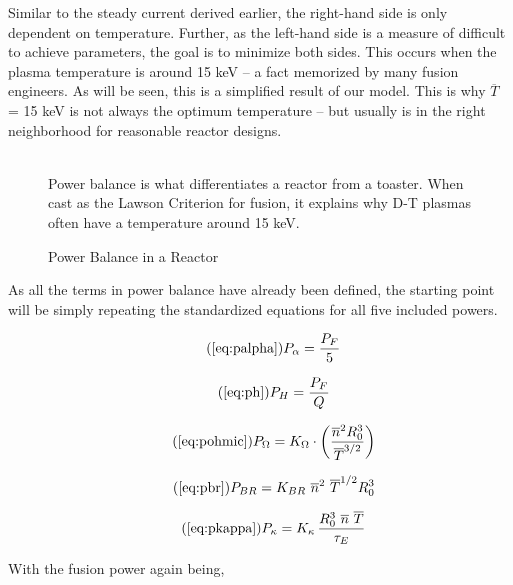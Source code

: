 Similar to the steady current derived earlier, the right-hand side is only dependent on temperature. Further, as the left-hand side is a measure of difficult to achieve parameters, the goal is to minimize both sides. This occurs when the plasma temperature is around 15 keV -- a fact memorized by many fusion engineers. As will be seen, this is a simplified result of our model. This is why $\overline T$ = 15 keV is not always the optimum temperature -- but usually is in the right neighborhood for reasonable reactor designs.

\begin{figure}
	\centering
	\begin{adjustbox}{width=0.75\textwidth}
		
	\end{adjustbox}
	\caption{Power Balance in a Reactor} ~\\
	\small Power balance is what differentiates a reactor from a toaster. When cast as the Lawson Criterion for fusion, it explains why D-T plasmas often have a temperature around 15 keV.
\end{figure}

As all the terms in power balance have already been defined, the starting point will be simply repeating the standardized equations for all five included powers.

\begin{equation}
	\tag{\ref{eq:palpha}}
	P_\alpha = \frac{P_F}{5}
\end{equation}

\begin{equation}
	\tag{\ref{eq:ph}}
	P_H = \frac{P_F}{Q}
\end{equation}

\begin{equation}
	\tag{\ref{eq:pohmic}}
	P_\Omega = K_\Omega \cdot \left( \frac{ \overline n ^ 2 R_0^3 }{\overline T ^ {3/2}} \right)
\end{equation}

\begin{equation}
	\tag{\ref{eq:pbr}}
	P_{BR} = K_{BR} \ \overline n ^ 2 \ \overline T ^ {1/2} R_0^3 
\end{equation}

\begin{equation}
	\tag{\ref{eq:pkappa}}
	P_\kappa = K_\kappa \, \frac{ R_0 ^ 3 \ \overline{n}  \ \overline{T}  }{\tau_E} 
\end{equation}

With the fusion power again being,

